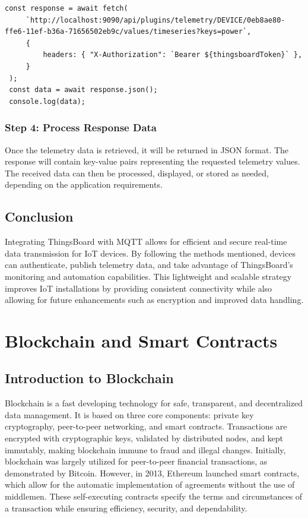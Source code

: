 \documentclass[a4paper,12pt]{report}
\begin{document}
 \begin{lstlisting}[caption={Fetching Data from ThingsBoard using Token Authentication method}]
 const response = await fetch( 
     `http://localhost:9090/api/plugins/telemetry/DEVICE/0eb8ae80-ffe6-11ef-b36a-71656502eb9c/values/timeseries?keys=power`,
     {
         headers: { "X-Authorization": `Bearer ${thingsboardToken}` },
     }
 );
 const data = await response.json();
 console.log(data);
 \end{lstlisting}
 
 \subsection{Step 4: Process Response Data}
 Once the telemetry data is retrieved, it will be returned in JSON format. The response will contain key-value pairs representing the requested telemetry values. The received data can then be processed, displayed, or stored as needed, depending on the application requirements.
 \section{Conclusion}
 Integrating ThingsBoard with MQTT allows for efficient and secure real-time data transmission for IoT devices. By following the methods mentioned, devices can authenticate, publish telemetry data, and take advantage of ThingsBoard's monitoring and automation capabilities. This lightweight and scalable strategy improves IoT installations by providing consistent connectivity while also allowing for future enhancements such as encryption and improved data handling.

\chapter{Blockchain and Smart Contracts}
\section{Introduction to Blockchain}
Blockchain is a fast developing technology for safe, transparent, and decentralized data management. It is based on three core components: private key cryptography, peer-to-peer networking, and smart contracts\cite{swan2016blockchain}. Transactions are encrypted with cryptographic keys, validated by distributed nodes, and kept immutably, making blockchain immune to fraud and illegal changes\cite{tern2021survey}.
Initially, blockchain was largely utilized for peer-to-peer financial transactions, as demonstrated by Bitcoin.  However, in 2013, Ethereum launched smart contracts, which allow for the automatic implementation of agreements without the use of middlemen\cite{yuan2018shadoweth}.  These self-executing contracts specify the terms and circumstances of a transaction while ensuring efficiency, security, and dependability\cite{falazi2020smart}.
\end{document}

